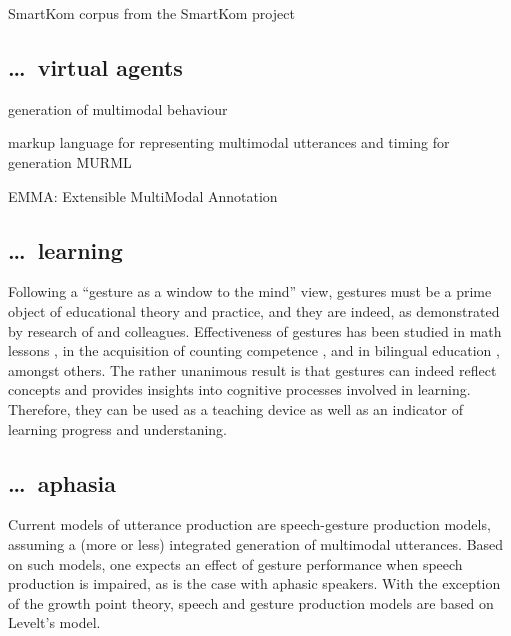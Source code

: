 \documentclass[output=paper]{langsci/langscibook}
\begin{document}
SmartKom corpus \citep{Schiel:Steininger:Tuerk:2003} from the SmartKom project \citep{Wahlster:2006}



\subsection{\ldots\ virtual agents}

generation of multimodal behaviour
\citep{Cassell:Stone:Yan:2000}

markup language for representing multimodal utterances and timing for generation MURML \citep{Kranstedt:Kopp:Wachsmuth:2002:b}

EMMA: Extensible MultiModal Annotation \citep{Johnston:2009}



\subsection{\ldots\ learning}

Following a \enquote{gesture as a window to the mind} view, gestures must be a prime object of educational theory and practice, and they are indeed, as demonstrated by research of \citet{Cook:Goldin-Meadow:2006} and colleagues.
%
Effectiveness of gestures has been studied in math lessons \citep{Goldin-Meadow:Nusbaum:Kelly:Wagner:2001}, in the acquisition of counting competence \citep{Alibali:DiRusso:1999}, and in bilingual education \citep{Breckinridge-Church:Ayman-Nolley:Mahootian:2004}, amongst others.
%
The rather unanimous result is that gestures can indeed reflect concepts and provides insights into cognitive processes involved in learning.
%
Therefore, they can be used as a teaching device as well as an indicator of learning progress and understaning. 


\subsection{\ldots\ aphasia}

Current models of utterance production are speech-gesture production models, assuming a (more or less) integrated generation of multimodal utterances.
%
Based on such models, one expects an effect of gesture performance when speech production is impaired, as is the case with aphasic speakers.
%
With the exception of the growth point theory, speech and gesture production models are based on Levelt's \citeyear{Levelt:1989}  model.
\end{document}
